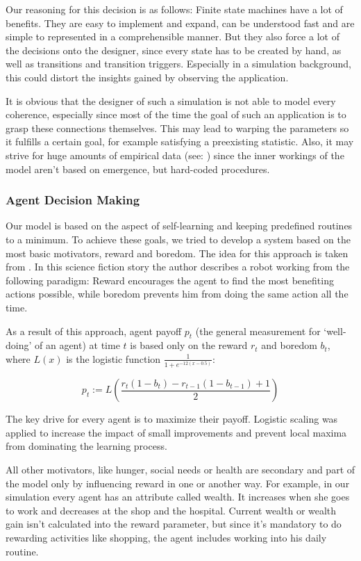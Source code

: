\documentclass[table]{sig-alternate-05-2015}
\begin{document}
Our reasoning for this decision is as follows: Finite state machines have a lot of benefits. They are easy to implement and expand, can be understood fast and are simple to represented in a comprehensible manner. But they also force a lot of the decisions onto the designer, since every state has to be created by hand, as well as transitions and transition triggers. Especially in a simulation background, this could distort the insights gained by observing the application.

It is obvious that the designer of such a simulation is not able to model every coherence, especially since most of the time the goal of such an application is to grasp these connections themselves. This may lead to warping the parameters so it fulfills a certain goal, for example satisfying a preexisting statistic. Also, it may strive for huge amounts of empirical data (see: \cite{biowar}) since the inner workings of the model aren't based on emergence, but hard-coded procedures. 

\subsubsection{Agent Decision Making}
\label{sec:decisions}

Our model is based on the aspect of self-learning and keeping predefined routines to a minimum. To achieve these goals, we tried to develop a system based on the most basic motivators, reward and boredom. The idea for this approach is taken from \cite{adams}. In this science fiction story the author describes a robot working from the following paradigm:
Reward encourages the agent to find the most benefiting actions possible, while boredom prevents him from doing the same action all the time.

As a result of this approach, agent payoff $p_t$ (the general measurement for `well-doing' of an agent) at time $t$ is based only on the reward $r_t$ and boredom $b_t$, where $L(x)$ is the logistic function $\frac{1}{1 + e^{-12(x - 0.5)}}$:

\begin{equation*}
p_t := L(\frac{r_t (1 - b_t) - r_{t-1}(1-b_{t-1}) + 1}2)
\end{equation*}

The key drive for every agent is to maximize their payoff. Logistic scaling was applied to increase the impact of small improvements and prevent local maxima from dominating the learning process.

All other motivators, like hunger, social needs or health are secondary and part of the model only by influencing reward in one or another way. For example, in our simulation every agent has an attribute called wealth. It increases when she goes to work and decreases at the shop and the hospital. Current wealth or wealth gain isn't calculated into the reward parameter, but since it's mandatory to do rewarding activities like shopping, the agent includes working into his daily routine.
\end{document}
